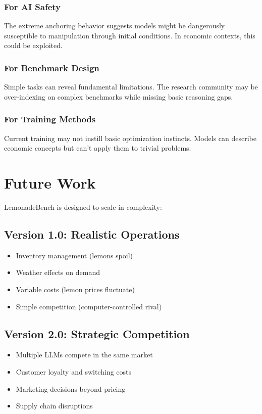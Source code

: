 \documentclass[11pt]{article}
\begin{document}
\subsubsection{For AI Safety}
The extreme anchoring behavior suggests models might be dangerously susceptible to manipulation through initial conditions. In economic contexts, this could be exploited.

\subsubsection{For Benchmark Design}
Simple tasks can reveal fundamental limitations. The research community may be over-indexing on complex benchmarks while missing basic reasoning gaps.

\subsubsection{For Training Methods}
Current training may not instill basic optimization instincts. Models can describe economic concepts but can't apply them to trivial problems.

\section{Future Work}

LemonadeBench is designed to scale in complexity:

\subsection{Version 1.0: Realistic Operations}
\begin{itemize}
    \item Inventory management (lemons spoil)
    \item Weather effects on demand
    \item Variable costs (lemon prices fluctuate)
    \item Simple competition (computer-controlled rival)
\end{itemize}

\subsection{Version 2.0: Strategic Competition}
\begin{itemize}
    \item Multiple LLMs compete in the same market
    \item Customer loyalty and switching costs
    \item Marketing decisions beyond pricing
    \item Supply chain disruptions
\end{itemize}
\end{document}
